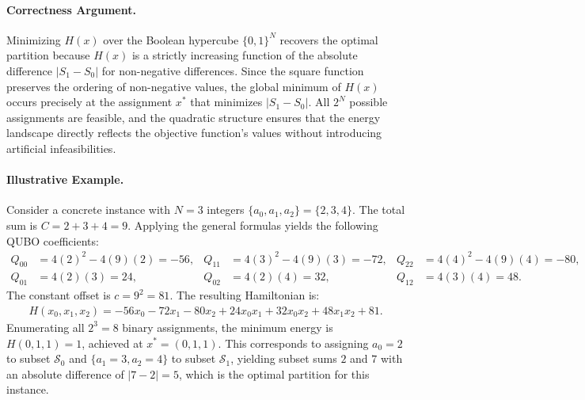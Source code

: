 \documentclass[12pt]{article}
\begin{document}
\paragraph{Correctness Argument.}
Minimizing $H(x)$ over the Boolean hypercube $\{0,1\}^N$ recovers the optimal partition because $H(x)$ is a strictly increasing function of the absolute difference $|S_1 - S_0|$ for non-negative differences. Since the square function preserves the ordering of non-negative values, the global minimum of $H(x)$ occurs precisely at the assignment $x^*$ that minimizes $|S_1 - S_0|$. All $2^N$ possible assignments are feasible, and the quadratic structure ensures that the energy landscape directly reflects the objective function's values without introducing artificial infeasibilities.

\paragraph{Illustrative Example.}
Consider a concrete instance with $N=3$ integers $\{a_0, a_1, a_2\} = \{2, 3, 4\}$. The total sum is $C = 2 + 3 + 4 = 9$. Applying the general formulas yields the following QUBO coefficients:
\begin{align}
    Q_{00} &= 4(2)^2 - 4(9)(2) = -56, & Q_{11} &= 4(3)^2 - 4(9)(3) = -72, & Q_{22} &= 4(4)^2 - 4(9)(4) = -80, \\
    Q_{01} &= 4(2)(3) = 24, & Q_{02} &= 4(2)(4) = 32, & Q_{12} &= 4(3)(4) = 48.
\end{align}
The constant offset is $c = 9^2 = 81$. The resulting Hamiltonian is:
\begin{align}
    H(x_0, x_1, x_2) = -56x_0 - 72x_1 - 80x_2 + 24x_0x_1 + 32x_0x_2 + 48x_1x_2 + 81.
\end{align}
Enumerating all $2^3 = 8$ binary assignments, the minimum energy is $H(0, 1, 1) = 1$, achieved at $x^* = (0, 1, 1)$. This corresponds to assigning $a_0=2$ to subset $\mathcal{S}_0$ and $\{a_1=3, a_2=4\}$ to subset $\mathcal{S}_1$, yielding subset sums $2$ and $7$ with an absolute difference of $|7-2|=5$, which is the optimal partition for this instance.
\end{document}
